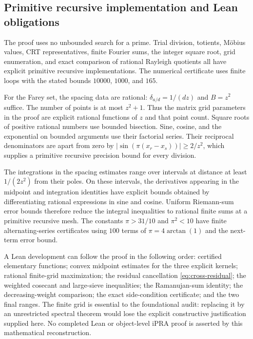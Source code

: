\subsection{Primitive recursive implementation and Lean obligations}

The proof uses no unbounded search for a prime.  Trial division,
totients, M\"obius values, CRT representatives, finite Fourier sums,
the integer square root, grid enumeration, and exact comparison of
rational Rayleigh quotients all have explicit primitive recursive
implementations.  The numerical certificate uses finite loops with
the stated bounds $10000$, $1000$, and $165$.

For the Farey set, the spacing data are rational:
$\delta_{a/d}=1/(dz)$ and $B=z^2$ suffice.  The number of points is
at most $z^2+1$.  Thus the matrix grid parameters in the proof are
explicit rational functions of $z$ and that point count.  Square
roots of positive rational numbers use bounded bisection.
Sine, cosine, and the exponential on bounded arguments use their
factorial series.  Their reciprocal denominators are apart from
zero by $|\sin(\pi(x_r-x_s))|\geq2/z^2$, which supplies a
primitive recursive precision bound for every division.

The integrations in the spacing estimates range over intervals at
distance at least $1/(2z^2)$ from their poles.  On these intervals,
the derivatives appearing in the midpoint and integration identities
have explicit bounds obtained by differentiating rational expressions
in sine and cosine.  Uniform Riemann-sum error bounds therefore
reduce the integral inequalities to rational finite sums at a
primitive recursive mesh.  The constants $\pi>31/10$ and
$\pi^2<10$ have finite alternating-series certificates using
$100$ terms of $\pi=4\arctan(1)$ and the next-term error bound.

A Lean development can follow the proof in the following order:
certified elementary functions; convex midpoint estimates for the
three explicit kernels; rational finite-grid maximization;
the residual cancellation \eqref{eq:cross-residual}; the weighted
cosecant and large-sieve inequalities; the Ramanujan-sum identity;
the decreasing-weight comparison; the exact side-condition
certificate; and the two final ranges.  The finite grid is essential
to the foundational audit: replacing it by an unrestricted spectral
theorem would lose the explicit constructive justification supplied
here.  No completed Lean or object-level iPRA proof is asserted by
this mathematical reconstruction.

